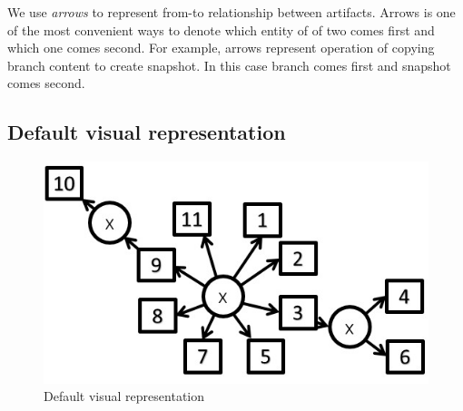 \documentclass[journal]{vgtc}                %
\begin{document}
We use \textit{arrows} to represent from-to relationship between artifacts. Arrows is one of the most convenient ways to denote which entity of of two comes first and which one comes second. For example, arrows represent operation of copying branch content to create snapshot. In this case branch comes first and snapshot comes second.


\subsection{Default visual representation}

\begin{figure}[H]
\includegraphics[scale=0.7]{default_visualization}
\caption{Default visual representation}
\label{default_visualization}
\end{figure}


%
\end{document}
